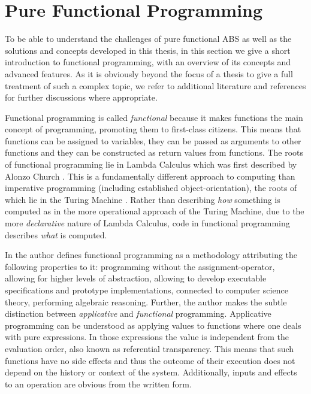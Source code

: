 \section{Pure Functional Programming}
\label{sec:background_fp}
To be able to understand the challenges of pure functional ABS as well as the solutions and concepts developed in this thesis, in this section we give a short introduction to functional programming, with an overview of its concepts and advanced features. As it is obviously beyond the focus of a thesis to give a full treatment of such a complex topic, we refer to additional literature and references for further discussions where appropriate.

Functional programming is called \textit{functional} because it makes functions the main concept of programming, promoting them to first-class citizens. This means that functions can be assigned to variables, they can be passed as arguments to other functions and they can be constructed as return values from functions. The roots of functional programming lie in Lambda Calculus which was first described by Alonzo Church \cite{church_unsolvable_1936}. This is a fundamentally different approach to computing than imperative programming (including established object-orientation), the roots of which lie in the Turing Machine \cite{turing_computable_1937}. Rather than describing \textit{how} something is computed as in the more operational approach of the Turing Machine, due to the more \textit{declarative} nature of Lambda Calculus, code in functional programming describes \textit{what} is computed.

In \cite{maclennan_functional_1990} the author defines functional programming as a methodology attributing the following properties to it: programming without the assignment-operator, allowing for higher levels of abstraction, allowing to develop executable specifications and prototype implementations, connected to computer science theory, performing algebraic reasoning. Further, the author makes the subtle distinction between \textit{applicative} and \textit{functional} programming. Applicative programming can be understood as applying values to functions where one deals with pure expressions. In those expressions the value is independent from the evaluation order, also known as referential transparency. This means that such functions have no side effects and thus the outcome of their execution does not depend on the history or context of the system. Additionally, inputs and effects to an operation are obvious from the written form.

